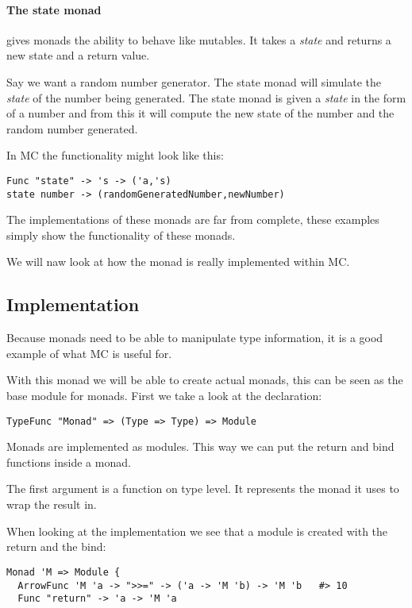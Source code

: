 \paragraph{The state monad}
gives monads the ability to behave like mutables.
It takes a \emph{state} and returns a new state and a return value.

Say we want a random number generator.
The state monad will simulate the \emph{state} of the number being generated.
The state monad is given a \emph{state} in the form of a number and from this it will compute the new state of the number and the random number generated.

In MC the functionality might look like this:

\begin{lstlisting}
Func "state" -> 's -> ('a,'s)
state number -> (randomGeneratedNumber,newNumber)
\end{lstlisting}

\bigskip

The implementations of these monads are far from complete, these examples simply show the functionality of these monads.

We will naw look at how the monad is really implemented within MC.


\subsection{Implementation}\label{sec:basicmonadsimplementation}
Because monads need to be able to manipulate type information, it is a good example of what MC is useful for.

With this monad we will be able to create actual monads, this can be seen as the base module for monads.
First we take a look at the declaration:

\begin{lstlisting}
TypeFunc "Monad" => (Type => Type) => Module
\end{lstlisting}

Monads are implemented as modules.
This way we can put the return and bind functions inside a monad.

The first argument is a function on type level.
It represents the monad it uses to wrap the result in.

When looking at the implementation we see that a module is created with the return and the bind:

\begin{lstlisting}
Monad 'M => Module {
  ArrowFunc 'M 'a -> ">>=" -> ('a -> 'M 'b) -> 'M 'b   #> 10
  Func "return" -> 'a -> 'M 'a
\end{lstlisting}

